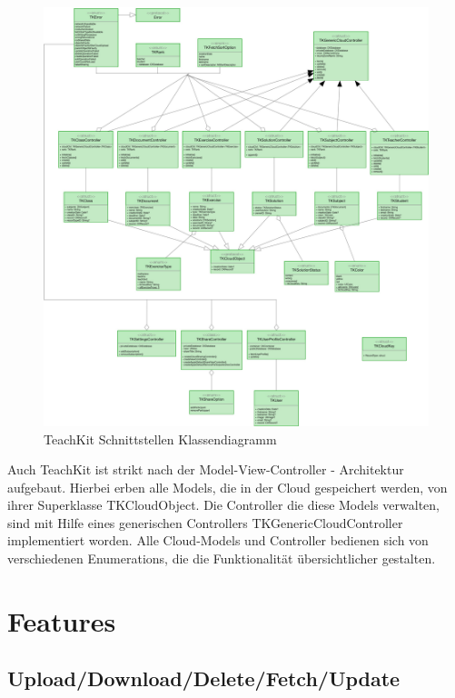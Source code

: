 \begin{figure}
  \includegraphics[width=\linewidth]{images/Klassendiagram_TeachKit.jpg}
  \caption{TeachKit Schnittstellen Klassendiagramm}
  \label{fig:diagramTeachKit}
\end{figure}

Auch TeachKit ist strikt nach der Model-View-Controller - Architektur aufgebaut. Hierbei erben alle Models, die in der Cloud gespeichert werden, von ihrer Superklasse TKCloudObject. Die Controller die diese Models verwalten, sind mit Hilfe eines generischen Controllers TKGenericCloudController implementiert worden. Alle Cloud-Models und Controller bedienen sich von verschiedenen Enumerations, die die Funktionalität übersichtlicher gestalten.

\newpage


\section{Features}

\subsection{Upload/Download/Delete/Fetch/Update}

